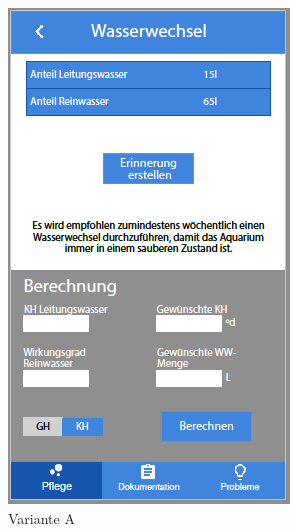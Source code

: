 \begin{figure}
	\begin{subfigure}[b]{0.5\textwidth}
		\includegraphics[width=\textwidth]{Wasserwechsel}
		\caption{Variante A}
		\label{care:ww:a}
	\end{subfigure}	
	\begin{subfigure}[b]{0.5\textwidth}

\end{subfigure}
\end{figure}
